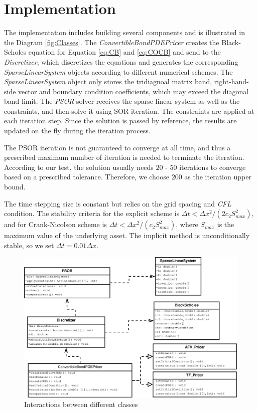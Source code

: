 \documentclass[12pt]{article}
\begin{document}
\section{Implementation}
The implementation includes building several components and is illustrated in the Diagram \ref{fig:Classes}. The \textit{ConvertibleBondPDEPricer} creates the Black-Scholes equation for Equation \ref{eq:CB} and \ref{eq:COCB} and send to the \textit{Discretizer}, which discretizes the equations and generates the corresponding \textit{SparseLinearSystem} objects according to different numerical schemes. The \textit{SparseLinearSystem} object only stores the tridiagnoal matrix band, right-hand-side vector and boundary condition coefficients, which may exceed the diagonal band limit. The \textit{PSOR} solver receives the sparse linear system as well as the constraints, and then solve it using SOR iteration. The constraints are applied at each iteration step. Since the solution is passed by reference, the results are updated on the fly during the iteration process.

The PSOR iteration is not guaranteed to converge at all time, and thus a prescribed maximum number of iteration is needed to terminate the iteration. According to our test, the solution usually needs $20$ - $50$ iterations to converge based on a prescribed tolerance. Therefore, we choose $200$ as the iteration upper bound.

The time stepping size is constant but relies on the grid spacing and \textit{CFL} condition. The stability criteria for the explicit scheme is $\Delta t < \Delta x^2/(2c_2S_{max}^2)$, and for Crank-Nicolson scheme is $\Delta t < \Delta x^2/(c_2S_{max}^2)$, where $S_{max}$ is the maximum value of the underlying asset. The implicit method is unconditionally stable, so we set $\Delta t = 0.01\Delta x$.
\begin{figure}[!htbp]
\includegraphics[width=\textwidth]{Figures/CBobjects}
\caption{Interactions between different classes}
\end{figure}
\label{fig:Classes}
\end{document}
